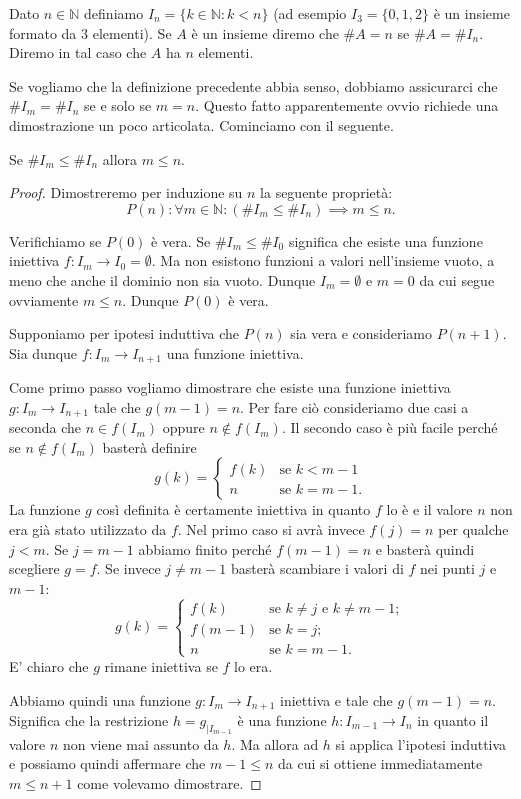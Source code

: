 \documentclass[italian,a4paper,hidelinks,headinclude]{scrartcl}
\newcommand{\NN}{{\mathbb N}}
\newcommand{\enclose}[1]{\left({#1}\right)}
\begin{document}
\begin{definition}
Dato $n\in \NN$ definiamo $I_n = \{k\in \NN\colon k < n\}$
(ad esempio $I_3=\{0,1,2\}$ è un insieme formato da $3$ elementi).
Se $A$ è un insieme diremo che $\# A= n$ se $\# A = \# I_n$.
Diremo in tal caso che $A$ ha $n$ elementi.
\end{definition}

Se vogliamo che la definizione precedente abbia senso,
dobbiamo assicurarci che $\# I_m = \# I_n$ se e solo se $m=n$.
Questo fatto apparentemente ovvio richiede una dimostrazione
un poco articolata. Cominciamo con il seguente.

\begin{lemma}\label{lemma:3834}
  Se $\# I_m \le \# I_n$ allora $m\le n$.
\end{lemma}
%
\begin{proof}
  Dimostreremo per induzione su $n$ la seguente proprietà:
  \[
    P(n)\colon \forall m\in \NN\colon \enclose{\#I_m\le \#I_n}\implies m\le n.
  \]

Verifichiamo se $P(0)$ è vera. Se $\#I_m\le \#I_0$ significa che esiste una
funzione iniettiva $f\colon I_m \to I_0 = \emptyset$. Ma non esistono funzioni
a valori nell'insieme vuoto, a meno che anche il dominio non sia vuoto. Dunque
$I_m=\emptyset$ e $m=0$ da cui segue ovviamente $m\le n$. Dunque $P(0)$ è vera.

Supponiamo per ipotesi induttiva che $P(n)$ sia vera e consideriamo $P(n+1)$.
Sia dunque $f\colon I_m \to I_{n+1}$ una funzione iniettiva.

Come primo passo vogliamo dimostrare che esiste una funzione iniettiva
$g\colon I_m \to I_{n+1}$ tale che $g(m-1)=n$.
Per fare ciò consideriamo due casi a seconda che $n\in f(I_m)$
oppure $n\not \in f(I_m)$.
Il secondo caso è più facile perché se $n\not \in f(I_m)$ basterà definire
\[
  g(k) =
  \begin{cases}
    f(k) & \text{se $k<m-1$}\\
    n & \text{se $k=m-1$}.
  \end{cases}
\]
La funzione $g$ così definita è certamente iniettiva in quanto $f$ lo è e il
valore $n$ non era già stato utilizzato da $f$.
Nel primo caso si avrà invece $f(j)=n$ per qualche $j<m$.
Se $j=m-1$ abbiamo finito perché $f(m-1)=n$ e basterà quindi scegliere $g=f$.
Se invece $j\neq m-1$ basterà scambiare i valori di $f$ nei punti $j$ e $m-1$:
\[
g(k) =
\begin{cases}
  f(k) & \text{se $k\neq j$ e $k\neq m-1$};\\
  f(m-1) & \text{se $k=j$};\\
  n & \text{se $k=m-1$}.
\end{cases}
\]
E' chiaro che $g$ rimane iniettiva se $f$ lo era.

Abbiamo quindi una funzione $g\colon I_m \to I_{n+1}$ iniettiva e tale
che $g(m-1)=n$. Significa che la restrizione $h = g_{|I_{m-1}}$ è una funzione
$h\colon I_{m-1}\to I_n$ in quanto il valore $n$ non viene mai assunto da $h$.
Ma allora ad $h$ si applica l'ipotesi induttiva e possiamo quindi affermare che
$m-1\le n$ da cui si ottiene immediatamente $m\le n+1$ come volevamo dimostrare.
\end{proof}
\end{document}
